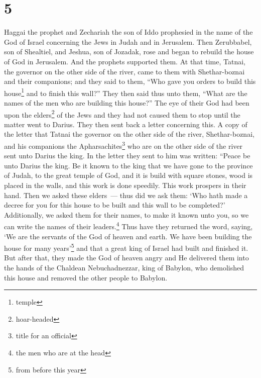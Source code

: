 \section{5}
\begin{enumerate}[align=center]
     Haggai the prophet and Zechariah the son of Iddo prophesied in the name of the God of Israel concerning the Jews in Judah and in Jerusalem.%
     Then Zerubbabel, son of Shealtiel, and Jeshua, son of Jozadak, rose and began to rebuild the house of God in Jerusalem. And the prophets supported them.%
     At that time, Tatnai, the governor on the other side of the river, came to them with Shethar-boznai and their companions; and they said to them, ``Who gave you orders to build this house\footnote{temple} and to finish this wall?''%
     They then said thus unto them, ``What are the names of the men who are building this house?''%
     The eye of their God had been upon the elders\footnote{hoar-headed} of the Jews and they had not caused them to stop until the matter went to Darius. They then sent back a letter concerning this.%
     A copy of the letter that Tatnai the governor on the other side of the river, Shethar-boznai, and his companions the Apharsachites\footnote{title for an official} who are on the other side of the river sent unto Darius the king.%
     In the letter they sent to him was written: ``Peace be unto Darius the king.%
     Be it known to the king that we have gone to the province of Judah, to the great temple of God, and it is build with square stones, wood is placed in the walls, and this work is done speedily. This work prospers in their hand.%
     Then we asked these elders~--- thus did we ask them: `Who hath made a decree for you for this house to be built and this wall to be completed?'%
     Additionally, we asked them for their names, to make it known unto you, so we can write the names of their leaders.\footnote{the men who are at the head}%
     Thus have they returned the word, saying, `We are the servants of the God of heaven and earth. We have been building the house for many years'\footnote{from before this year} and that a great king of Israel had built and finished it.%
     But after that, they made the God of heaven angry and He delivered them into the hands of the Chaldean Nebuchadnezzar, king of Babylon, who demolished this house and removed the other people to Babylon.%

\end{enumerate}
